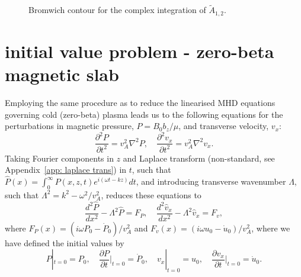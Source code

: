 \documentclass{aastex61}
\begin{document}
\begin{figure}
	\centering
	\label{fig: brom cont incomp}
	\caption{Bromwich contour for the complex integration of $\tilde{A}_{1,2}$.}
\end{figure}







\section{initial value problem - zero-beta magnetic slab}

Employing the same procedure as \cite{rud_etal06} to reduce the linearised MHD equations governing cold (zero-beta) plasma leads us to the following equations for the perturbations in magnetic pressure, $P = B_0b_z/\mu$, and transverse velocity, $v_x$:
\begin{equation}
\frac{\partial^2P}{\partial{}t^2} = v_A^2 \nabla^2P, \quad \frac{\partial^2v_x}{\partial{}t^2} = v_A^2 \nabla^2v_x.
\end{equation}
Taking Fourier components in $z$ and Laplace transform (non-standard, see Appendix~\ref{app: laplace trans}) in $t$, such that $\hat{P}(x) = \int_0^\infty P(x,z,t)e^{i(\omega{}t-kz)} dt$, and introducing transverse wavenumber $\Lambda$, such that $\Lambda^2 = k^2 - \omega^2 / v_A^2$, reduces these equations to
\begin{equation}
\frac{d^2\hat{P}}{dx^2} - \Lambda^2 \hat{P} = F_P, \quad \frac{d^2\hat{v}_x}{dx^2} - \Lambda^2 \hat{v}_x = F_v,
\end{equation}
where $F_P(x) = (i\omega P_0 - \dot{P}_0) / v_A^2$ and $F_v(x) = (i\omega u_0 - \dot{u}_0) / v_A^2$, where we have defined the initial values by
\begin{equation}
P|_{t=0} = P_0, \quad \frac{\partial{}P}{\partial{t}}\biggr\rvert_{t=0} = \dot{P}_0, \quad v_x|_{t=0} = u_0, \quad \frac{\partial{}v_x}{\partial{t}}\biggr\rvert_{t=0} = \dot{u}_0.
\end{equation}
\end{document}
